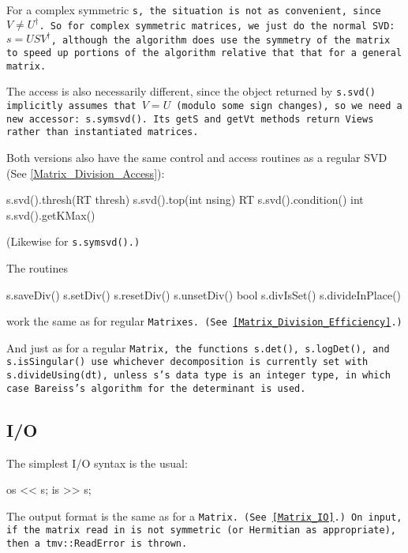 \begin{enumerate}
For a complex symmetric \tt{s}, the situation is not as convenient,
since $V \neq U^\dagger$.
So for complex symmetric matrices, we
just do the normal SVD: $s = USV^\dagger$, although the algorithm
does use the symmetry of the matrix to 
speed up portions of the algorithm relative that that for a general matrix.

The access is also necessarily different, since the object returned by 
\tt{s.svd()} implicitly assumes that $V = U$ (modulo some sign changes), 
so we need a 
new accessor: \tt{s.symsvd()}.  Its \tt{getS} and \tt{getVt} methods return Views
rather than instantiated matrices.

Both versions also have the same control and access routines as a regular SVD
(See \ref{Matrix_Division_Access}):
\begin{tmvcode}
s.svd().thresh(RT thresh)
s.svd().top(int nsing)
RT s.svd().condition()
int s.svd().getKMax()
\end{tmvcode}
(Likewise for \tt{s.symsvd()}.)

\end{enumerate}
The routines 
\begin{tmvcode}
s.saveDiv()
s.setDiv()
s.resetDiv()
s.unsetDiv()
bool s.divIsSet()
s.divideInPlace()
\end{tmvcode}
work the same as for regular \tt{Matrix}es.
(See \ref{Matrix_Division_Efficiency}.)

And just as for a regular \tt{Matrix}, the functions \tt{s.det()}, \tt{s.logDet()}, and \tt{s.isSingular()} use whichever decomposition is currently set with \tt{s.divideUsing(dt)},
unless \tt{s}'s data type is an integer type, in which case Bareiss's algorithm for the determinant
is used.

\subsection{I/O}
\label{SymMatrix_IO}

The simplest I/O syntax is the usual:
\begin{tmvcode}
os << s;
is >> s;
\end{tmvcode}
The output format is the same as for a \tt{Matrix}.
(See \ref{Matrix_IO}.)  On input, if the matrix read in is not symmetric (or Hermitian as appropriate), then a \tt{tmv::ReadError} is thrown.  

